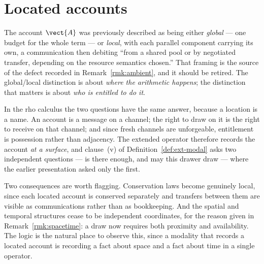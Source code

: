 \section{Located accounts}

The account $\vect{A}$ was previously described as being either
\emph{global} --- one budget for the whole term --- or \emph{local}, with
each parallel component carrying its own, a communication then debiting
``from a shared pool or by negotiated transfer, depending on the resource
semantics chosen.''  That framing is the source of the defect recorded in
Remark~\ref{rmk:ambient}, and it should be retired.  The global/local
distinction is about \emph{where the arithmetic happens}; the distinction
that matters is about \emph{who is entitled to do it}.

In the rho calculus the two questions have the same answer, because a
location is a name.  An account is a message on a channel; the right to
draw on it is the right to receive on that channel; and since fresh
channels are unforgeable, entitlement is possession rather than adjacency.
The extended operator therefore records the account \emph{at a surface},
and clause~(v) of Definition~\ref{def:ext-modal} asks two independent
questions --- is there enough, and may this drawer draw --- where the
earlier presentation asked only the first.

Two consequences are worth flagging.  Conservation laws become genuinely
local, since each located account is conserved separately and transfers
between them are visible as communications rather than as bookkeeping.
And the spatial and temporal structures cease to be independent
coordinates, for the reason given in Remark~\ref{rmk:spacetime}: a draw
now requires both proximity and availability.  The logic is the natural
place to observe this, since a modality that records a located account is
recording a fact about space and a fact about time in a single operator.

